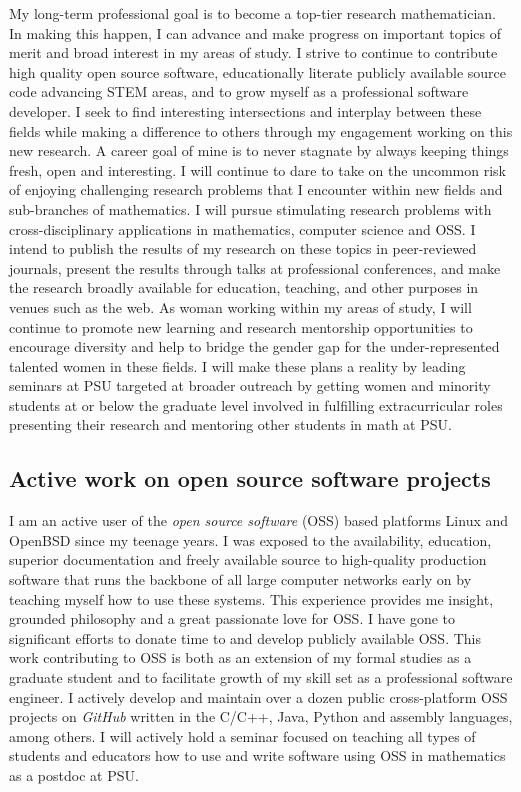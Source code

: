 \documentclass[10pt,reqno,letterpaper]{article}
\theoremstyle{plain}
\numberwithin{theorem}{section}
\theoremstyle{definition}
\begin{document}
My long-term professional goal is to become a top-tier research mathematician. In making this happen, 
I can advance and make progress on important topics of merit and broad interest in my areas of study. 
I strive to continue to contribute high quality open source software, educationally 
literate publicly available source code advancing STEM areas, and to grow myself as a 
professional software developer. 
I seek to find interesting intersections and interplay between these fields while making 
a difference to others through my engagement working on this new research. 
A career goal of mine is to never stagnate by always keeping things 
fresh, open and interesting. I will continue to dare to take on the uncommon risk of enjoying 
challenging research problems that I encounter within new fields and 
sub-branches of mathematics. 
I will pursue stimulating research problems 
with cross-disciplinary applications in mathematics, computer science and OSS. I intend to 
publish the results of my research on these topics in peer-reviewed journals, present 
the results through talks at professional conferences, and make the research broadly 
available for education, teaching, and other purposes in venues such as the web. As 
woman working within my areas of study, I will continue to promote new learning 
and research mentorship opportunities to encourage diversity and help to bridge the gender 
gap for the under-represented talented women in these fields.
I will make these plans a reality by leading seminars at PSU targeted at broader outreach by getting 
women and minority students at or below the graduate level involved in fulfilling extracurricular roles 
presenting their research and mentoring other students in math at PSU.

\subsection{Active work on open source software projects}

I am an active user of the \emph{open source software} (OSS) based 
platforms Linux and OpenBSD since my 
teenage years. I was exposed to the availability, education, superior documentation and 
freely available source to high-quality production software that runs the backbone of all large 
computer networks early on by teaching myself how to use these systems. This experience provides me 
insight, grounded philosophy and a great passionate love for OSS. I have gone to significant efforts to 
donate time to and develop publicly available OSS. This work contributing to OSS is 
both as an extension of my formal studies as 
a graduate student and to facilitate growth of my skill set as a professional software engineer. 
I actively develop and maintain 
over a dozen public cross-platform OSS projects on \emph{GitHub} 
written in the C/C++, Java, Python and assembly languages, among others.
I will actively hold a seminar focused on teaching all types of students and educators how to use and 
write software using OSS in mathematics as a postdoc at PSU. 
\end{document}
